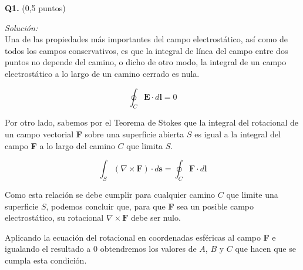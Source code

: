 \textbf{Q1.} (0,5 puntos)


\vspace{20px}
\textit{Solución:}
\\

Una de las propiedades más importantes del campo electrostático, así como de todos los campos conservativos,
es que la integral de línea del campo entre dos puntos no depende del camino, o dicho de otro modo, la
integral de un campo electrostático a lo largo de un camino cerrado es nula.

\begin{equation*}
    \oint_{C} \textbf{E} \cdot d\textbf{l} = 0
\end{equation*}

Por otro lado, sabemos por el Teorema de Stokes que la integral del rotacional de un campo vectorial \textbf{F}
sobre una superficie abierta
$S$ es igual a la integral del campo \textbf{F} a lo largo del camino $C$ que limita $S$.

\begin{equation*}
    \int_{S} (\nabla \times \textbf{F}) \cdot d\textbf{s} = \oint_{C} \textbf{F} \cdot d\textbf{l}
\end{equation*}

Como esta relación se debe cumplir para cualquier camino $C$ que limite una superficie $S$, podemos concluir que, para que
\textbf{F} sea un posible campo electrostático, su
rotacional $\nabla \times \textbf{F}$ debe ser nulo.

Aplicando la ecuación del rotacional en coordenadas esféricas al campo \textbf{F} e igualando el resultado a 0 obtendremos los valores de
$A$, $B$ y $C$ que hacen que se cumpla esta condición.

\renewcommand{\arraystretch}{1.2}

